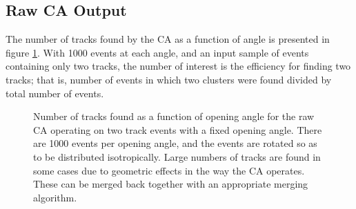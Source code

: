 \subsection{Raw \acl{CA} Output}
The number of tracks found by the \ac{CA} as a function of angle is presented in figure \ref{fig:ca_toy_raw_trackcounts}. With 1000 events at each angle, and an input sample of events containing only two tracks, the number of interest is the efficiency for finding two tracks; that is, number of events in which two clusters were found divided by total number of events.%

\begin{figure}
\centering
\caption[Track count as a function of angle for raw CA operating on toy MC events]{\label{fig:ca_toy_raw_trackcounts}Number of tracks found as a function of opening angle for the raw \ac{CA} operating on two track events with a fixed opening angle. There are 1000 events per opening angle, and the events are rotated so as to be distributed isotropically. Large numbers of tracks are found in some cases due to geometric effects in the way the \ac{CA} operates. These can be merged back together with an appropriate merging algorithm.}
\end{figure}

